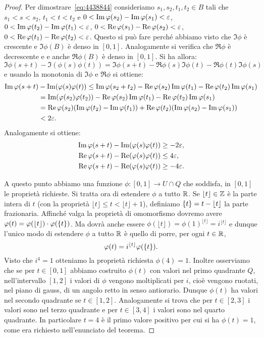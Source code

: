 \begin{proof}
Per dimostrare~\eqref{eq:4438844} consideriamo 
$s_1,s_2,t_1,t_2\in B$ tali che $s_1<s<s_2$, 
$t_1<t<t_2$
e $0<\operatorname{Im} \varphi(s_2)-\operatorname{Im} \varphi(s_1)<\varepsilon$, $0<\operatorname{Im} \varphi(t_2)-\operatorname{Im} \varphi(t_1)<\varepsilon$,
  $0<\operatorname{Re} \varphi(s_1)-\operatorname{Re} \varphi(s_2)<\varepsilon$, $0<\operatorname{Re} \varphi(t_1)-\operatorname{Re} \varphi(t_2)<\varepsilon$.
Questo si può fare perché abbiamo visto che $\Im  \phi$ è crescente 
e $\Im \phi(B)$ è denso in $[0,1]$.
Analogamente si verifica che $\Re \phi$ è decrescente e
e anche $\Re \phi(B)$ è denso in $[0,1]$.
Si ha allora:
\[
\Im \phi(s+t) - \Im (\phi(s)\phi(t))
= \Im \phi(s+t) - \Re \phi(s)\Im \phi(t) - \Re \phi(t)\Im \phi(s)
\]
e usando la monotonia di $\Im \phi$ e $\Re \phi$ si ottiene:
\begin{align*}
\operatorname{Im} \varphi(s+t) &- \operatorname{Im} (\varphi(s)\varphi(t))
\le \operatorname{Im} \varphi(s_2+t_2) - \operatorname{Re} \varphi(s_2)\operatorname{Im} \varphi(t_1) - \operatorname{Re} \varphi(t_2)\operatorname{Im} \varphi(s_1)\\ 
&= \operatorname{Im} (\varphi(s_2)\varphi(t_2)) - \operatorname{Re} \varphi(s_2)\operatorname{Im} \varphi(t_1) - \operatorname{Re} \varphi(t_2)\operatorname{Im} \varphi(s_1)\\ 
&= \operatorname{Re}\varphi(s_2)(\operatorname{Im}\varphi(t_2) - \operatorname{Im} \varphi(t_1))+\operatorname{Re}\varphi(t_2)(\operatorname{Im}\varphi(s_2) - \operatorname{Im} \varphi(s_1))\\
&< 2\varepsilon.
\end{align*}
Analogamente si ottiene:
\begin{align*}
\operatorname{Im} \varphi(s+t) - \operatorname{Im} (\varphi(s)\varphi(t))
&\ge -2\varepsilon,\\
\operatorname{Re} \varphi(s+t) - \operatorname{Re} (\varphi(s)\varphi(t))
&\le 4\varepsilon,\\
\operatorname{Re} \varphi(s+t) - \operatorname{Re} (\varphi(s)\varphi(t))
&\ge -4\varepsilon.
\end{align*}

A questo punto abbiamo una funzione $\phi\colon[0,1]\to U\cap Q$ 
che soddisfa, in $[0,1]$ le proprietà richieste.
Si tratta ora di estendere $\phi$ a tutto ${\mathbb R}$.
Se $\lfloor t \rfloor \in {\mathbb Z}$ è la parte intera di $t$ (con la proprietà 
$\lfloor t \rfloor \le t < \lfloor t \rfloor +1$), definiamo ${\left\{ t \right\}} = t-\lfloor t \rfloor $
la parte frazionaria. 
Affinché valga la proprietà
di omomorfismo dovremo avere $\varphi(t)=\varphi(\lfloor t \rfloor )\cdot\varphi({\left\{ t \right\}})$.
Ma dovrà anche essere $\phi(\lfloor t \rfloor )=\phi(1)^{\lfloor t \rfloor }=i^{\lfloor t \rfloor }$ e dunque
l'unico modo di estendere $\phi$ a tutto ${\mathbb R}$ è quello di porre,
per ogni $t\in {\mathbb R}$,
\[
  \varphi(t) = i^{\lfloor t \rfloor }\varphi({\left\{ t \right\}}).
\]
Visto che $i^4=1$ otteniamo la proprietà richiesta $\phi(4)=1$.
Inoltre osserviamo che se per $t\in[0,1]$ abbiamo costruito 
$\phi(t)$ con valori nel primo quadrante $Q$, nell'intervallo $[1,2]$
i valori di $\phi$ vengono moltiplicati per $i$, cioè vengono 
ruotati, nel piano di gauss, di un angolo retto in senso antiorario.
Dunque $\phi(t)$ ha valori nel secondo quadrante se $t\in[1,2]$.
Analogamente si trova che per $t\in[2,3]$ i valori sono nel terzo 
quadrante e per $t\in[3,4]$ i valori sono nel quarto quadrante.
In particolare $t=4$ è il primo valore positivo per cui si ha 
$\phi(t)=1$, come era richiesto nell'enunciato del teorema.


\end{proof}
